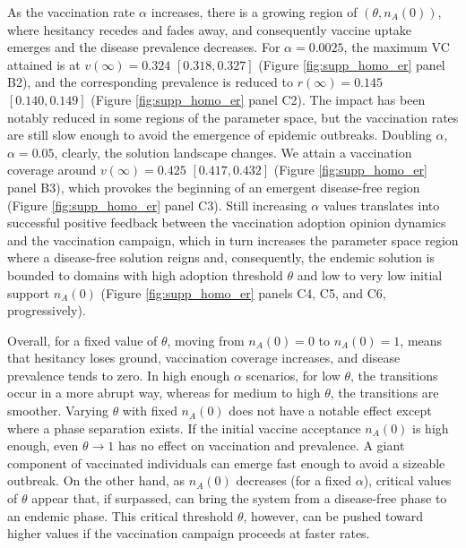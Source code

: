\documentclass[
 reprint,
 amsmath,amssymb,
 aps,
]{revtex4-2}
\begin{document}
As the vaccination rate $\alpha$ increases, there is a growing region of $(\theta,n_A(0))$, where hesitancy recedes and fades away, and consequently vaccine uptake emerges and the disease prevalence decreases. For $\alpha=0.0025$, the maximum VC attained is at $v(\infty)=0.324$ $[0.318, 0.327]$ (Figure \ref{fig:supp_homo_er} panel B2), and the corresponding prevalence is reduced to $r(\infty)=0.145$ $[0.140, 0.149]$ (Figure \ref{fig:supp_homo_er} panel C2). The impact has been notably reduced in some regions of the parameter space, but the vaccination rates are still slow enough to avoid the emergence of epidemic outbreaks. Doubling $\alpha$, $\alpha=0.05$, clearly, the solution landscape changes. We attain a vaccination coverage around $v(\infty)=0.425$ $[0.417, 0.432]$ (Figure \ref{fig:supp_homo_er} panel B3), which provokes the beginning of an emergent disease-free region (Figure \ref{fig:supp_homo_er} panel C3). Still increasing $\alpha$ values translates into successful positive feedback between the vaccination adoption opinion dynamics and the vaccination campaign, which in turn increases the parameter space region where a disease-free solution reigns and, consequently, the endemic solution is bounded to domains with high adoption threshold $\theta$ and low to very low initial support $n_A(0)$ (Figure \ref{fig:supp_homo_er} panels C4, C5, and C6, progressively). 

Overall, for a fixed value of $\theta$, moving from $n_A(0)=0$ to $n_A(0)=1$, means that hesitancy loses ground, vaccination coverage increases, and disease prevalence tends to zero. In high enough $\alpha$ scenarios, for low $\theta$, the transitions occur in a more abrupt way, whereas for medium to high $\theta$, the transitions are smoother. Varying $\theta$ with fixed $n_A(0)$ does not have a notable effect except where a phase separation exists. If the initial vaccine acceptance $n_A(0)$ is high enough, even $\theta\to 1$ has no effect on vaccination and prevalence. A giant component of vaccinated individuals can emerge fast enough to avoid a sizeable outbreak. On the other hand, as $n_A(0)$ decreases (for a fixed $\alpha$), critical values of $\theta$ appear that, if surpassed, can bring the system from a disease-free phase to an endemic phase. This critical threshold $\theta$, however, can be pushed toward higher values if the vaccination campaign proceeds at faster rates.
\end{document}
